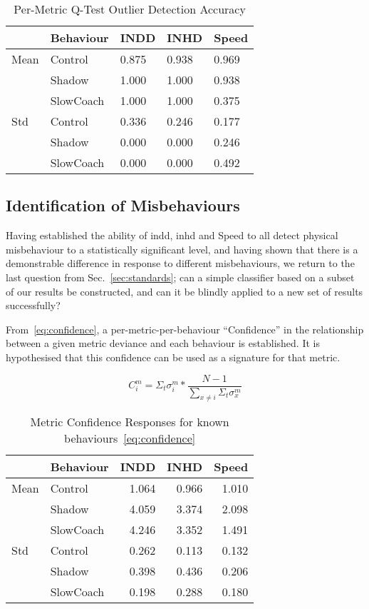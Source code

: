 \begin{table}
  \caption{Per-Metric Q-Test Outlier Detection Accuracy}
  \centering
\begin{tabular}{lllll}
\toprule
{} & Behaviour &  INDD &  INHD & Speed \\
\midrule
Mean & Control & 0.875 & 0.938 & 0.969 \\
     & Shadow & 1.000 & 1.000 & 0.938 \\
     & SlowCoach & 1.000 & 1.000 & 0.375 \\
Std & Control & 0.336 & 0.246 & 0.177 \\
     & Shadow & 0.000 & 0.000 & 0.246 \\
     & SlowCoach & 0.000 & 0.000 & 0.492 \\
\bottomrule
\end{tabular}
  \label{tab:per_metric_stats}
\end{table}

\subsection{Identification of Misbehaviours}
Having established the ability of \gls{indd}, \gls{inhd} and Speed to all detect physical misbehaviour to a statistically significant level, and having shown that there is a demonstrable difference in response to different misbehaviours, we return to the last question from Sec.~\ref{sec:standards}; can a simple classifier based on a subset of our results be constructed, and can it be blindly applied to a new set of results successfully?

From~\autoref{eq:confidence}, a per-metric-per-behaviour ``Confidence'' in the relationship between a given metric deviance and each behaviour is established. It is hypothesised that this confidence can be used as a signature for that metric.

\begin{equation}
C_{i}^{m} = \Sigma_t\sigma_{i}^m * \frac{N-1}{\sum_{x\neq i}{\Sigma_t\sigma_{x}^m}}\label{eq:confidence}
\end{equation}

\begin{table}[h]
  \caption{Metric Confidence Responses for known behaviours~\autoref{eq:confidence}}
  \centering
\begin{tabular}{llrrr}
\toprule
{} & Behaviour &  INDD &  INHD &  Speed \\
\midrule
Mean & Control & 1.064 & 0.966 &  1.010 \\
     & Shadow & 4.059 & 3.374 &  2.098 \\
     & SlowCoach & 4.246 & 3.352 &  1.491 \\
Std & Control & 0.262 & 0.113 &  0.132 \\
     & Shadow & 0.398 & 0.436 &  0.206 \\
     & SlowCoach & 0.198 & 0.288 &  0.180 \\
\bottomrule
\end{tabular}
  \label{tab:confidence}
\end{table}

